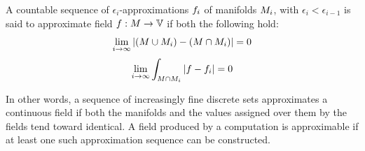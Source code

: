 \documentclass[12pt,a4paper,twoside,openright]{book}
\begin{document}
\begin{thrdefn}\label{def:approx}
  A countable sequence of $\epsilon_{i}$-approximations $f_i$ of manifolds $M_i$, with $\epsilon_{i} < \epsilon_{i-1}$ is said to approximate field $\field: \manifold \rightarrow
  \spaceof{\datavalue}$ if both the following hold:
  $$\lim_{i\rightarrow \infty} |(M \cup M_{i}) - (M \cap M_{i})| = 0$$
  $$\lim_{i\rightarrow \infty} \int_{M \cap M_{i}} |f-f_{i}| = 0$$
\end{thrdefn}
\noindent
In other words, a sequence of increasingly fine discrete sets approximates a continuous field if both the manifolds and the values assigned over them by the fields tend toward identical.
%
A field produced by a computation is approximable if at least one such approximation sequence can be constructed.
%
\end{document}

